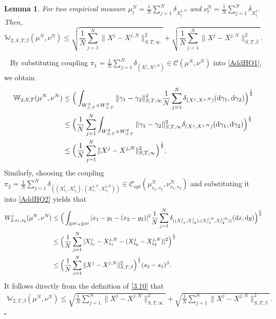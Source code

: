\documentclass[12pt]{article}
\newtheorem{lemma}[theorem]{Lemma}
\def\R{\mathbb R}
\def\d{\text{\rm{d}}}
\def\W{\mathbb{W}}
\newenvironment{proof}{{\noindent\it Proof.}\ }{\hfill $\square$\par}
\numberwithin{equation}{section}
\begin{document}
	\begin{lemma}\label{lem3.1}
		For two empirical measure $\mu_{t}^{N}=\frac{1}{N}\sum_{j=1}^{N}\delta_{X_t^{j,N}}$ and $\nu_{t}^{N}=\frac{1}{N}\sum_{j=1}^{N}\delta_{{X}^j_{t}}.$ Then,
		\begin{equation}
			\W_{2,S,T,\beta}(\mu^{N},\nu^{N})\leq \sqrt{\frac{1}{N}\sum_{j=1}^N\|X^j-X^{j,N}\|^2_{S,T,\infty}}+\sqrt{\frac{1}{N}\sum_{j=1}^N\|X^j-X^{j,N}\|^2_{S,T,\beta}}.
		\end{equation}	
	\end{lemma}
	\begin{proof}
		 By substituting coupling $\pi_1=\frac{1}{N}\sum_{j=1}^N\delta_{(X^j,X^{j,N})}\in \mathscr C (\mu^N,\nu^N)$ into \eqref{AddHO1}, we obtain
		 \begin{align*}
		 	\W_{2,S,T}(\mu^N,\nu^N)&\leq \Big(\int_{W^d_{S,T} \times W^d_{S,T}}\|\gamma_1-\gamma_2\|^2_{S,T,\infty}\frac{1}{N}\sum_{j=1}^N\delta_{(X^j,X^{j,N})}(\d \gamma_1,\d \gamma_2)\Big)^{\frac{1}{2}}\\
		 	&\leq \Big(\frac{1}{N}\sum_{j=1}^N\int_{W^d_{S,T} \times W^d_{S,T}}\|\gamma_1-\gamma_2\|^2_{S,T,\infty}\delta_{(X^j,X^{j,N})}(\d \gamma_1,\d \gamma_2)\Big)^{\frac{1}{2}}\\
		 	&\leq \Big(\frac{1}{N}\sum_{j=1}^N\|X^j-X^{j,N}\|^2_{S,T,\infty}\Big)^{\frac{1}{2}}.
		 \end{align*}
		 Similarly, choosing the coupling $\pi_2=\frac{1}{N}\sum_{j=1}^N\delta_{((X^j_{s_1},X^j_{s_2}),(X^{j,N}_{s_1},X^{j,N}_{s_2}))}\in \mathscr{C}_{opt}(\mu^N_{s_1,s_2},\nu^N_{s_1,s_2})$ and substituting it into \eqref{AddHO2} yields that
		 \begin{align*}
		 	W_{2,s_1,s_2}^c(\mu^N,\nu^N)&\leq \Big( \int_{\R^{2d}\times \R^{2d}}|x_1-y_1-(x_2-y_2)|^2\frac{1}{N}\sum_{j=1}^N\delta_{((X^j_{s_1},X^j_{s_2}),(X^{j,N}_{s_1},X^{j,N}_{s_2}))}(\d x, \d y)\Big)^{\frac{1}{2}}\\
		 	&\leq \Big( \frac{1}{N}\sum_{j=1}^N |X^j_{s_1}-X^{j,N}_{s_1}-(X^j_{s_2}-X^{j,N}_{s_2})|^2\Big)^{\frac{1}{2}}\\
		 	&\leq \Big( \frac{1}{N}\sum_{j=1}^N \|X^j-X^{j,N}\|^2_{S,T,\beta}\Big)^{\frac{1}{2}}(s_2-s_1)^{\beta}.
		 \end{align*}
		 It follows directly from the definition of \eqref{3.10} that
		 \begin{align*}
		 		\W_{2,T,\beta}(\mu^{N},\nu^{N})\leq \sqrt{\frac{1}{N}\sum_{j=1}^N\|X^j-X^{j,N}\|^2_{S,T,\infty}}+\sqrt{\frac{1}{N}\sum_{j=1}^N\|X^j-X^{j,N}\|^2_{S,T,\beta}}.
		 \end{align*}
	\end{proof}
	
\end{document}
